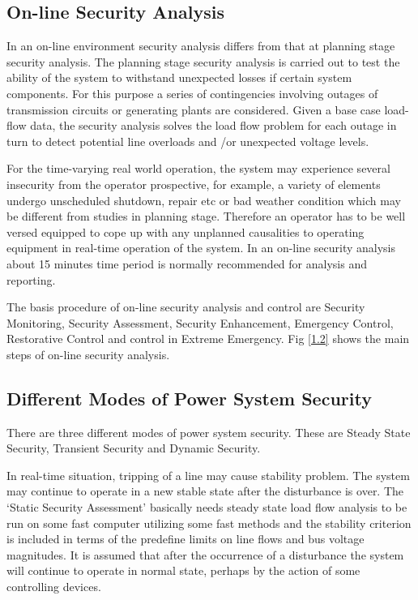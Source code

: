 \documentclass[a4paper,11pt]{article}
\begin{document}
\subsection{On-line Security Analysis}
In an on-line environment security analysis differs from that at planning stage security analysis. The planning stage security analysis is carried out to test the ability of the system to withstand unexpected losses if certain system components. For this purpose a series of contingencies involving outages of transmission circuits or generating plants are considered. Given a base case load-flow data, the security analysis solves the load flow problem for each outage in turn to detect potential line overloads and /or unexpected voltage levels.

For the time-varying real world operation, the system may experience several insecurity from the operator prospective, for example, a variety of elements undergo unscheduled shutdown, repair etc or bad weather condition which may be different from studies in planning stage. Therefore an operator has to be well versed equipped to cope up with any unplanned causalities to operating equipment in real-time operation of the system. In an on-line security analysis about 15 minutes time period is normally recommended for analysis and reporting.

The basis procedure of on-line security analysis and control are Security Monitoring, Security Assessment, Security Enhancement, Emergency Control, Restorative Control and control in Extreme Emergency. Fig \ref{1.2} shows the main steps of on-line security analysis.

\subsection{Different Modes of Power System Security}
There are three different modes of power system security. These are Steady State Security, Transient Security and Dynamic Security.

In real-time situation, tripping of a line may cause stability problem. The system may continue to operate in a new stable state after the disturbance is over. The `Static Security Assessment' basically needs steady state load flow analysis to be run on some fast computer utilizing some fast methods and the stability criterion is included in terms of the predefine limits on line flows and bus voltage magnitudes. It is assumed that after the occurrence of a disturbance the system will continue to operate in normal state, perhaps by the action of some controlling devices.
\end{document}
